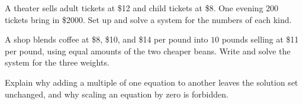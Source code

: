 \documentclass[12pt]{book}
\begin{document}
\begin{exercises}
\item A theater sells adult tickets at \$12 and child tickets at \$8. One evening
$200$ tickets bring in \$2000. Set up and solve a system for the numbers of each
kind.

\item A shop blends coffee at \$8, \$10, and \$14 per pound into $10$ pounds selling
at \$11 per pound, using equal amounts of the two cheaper beans. Write and solve the
system for the three weights.

\item Explain why adding a multiple of one equation to another leaves the solution
set unchanged, and why scaling an equation by zero is forbidden.
\end{exercises}
\end{document}
